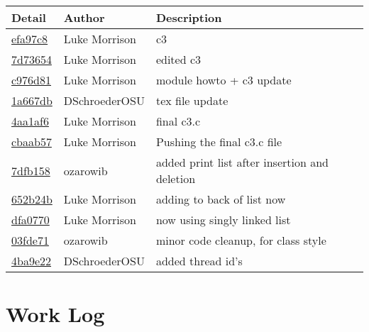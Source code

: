 \documentclass[10pt,letterpaper,draftclsnofoot,onecolumn]{IEEEtran}
\begin{document}
\begin{tabular}{l l l}\textbf{Detail} & \textbf{Author} & \textbf{Description}\\\hline
\href{https://github.com/DSchroederOSU/CS444-Group_11_05/commit/efa97c8a531581b74d351c5c3f0f8b1f13540455}{efa97c8} & Luke Morrison & c3\\\hline
\href{https://github.com/DSchroederOSU/CS444-Group_11_05/commit/7d73654979eb7198995a959c292dd2062401b464}{7d73654} & Luke Morrison & edited c3\\\hline
\href{https://github.com/DSchroederOSU/CS444-Group_11_05/commit/c976d8184cf0397b6f7128df89ca1d29ebc5f086}{c976d81} & Luke Morrison & module howto + c3 update\\\hline
\href{https://github.com/DSchroederOSU/CS444-Group_11_05/commit/1a667dbf3174f73e60390bb5b52e5872f4527904}{1a667db} & DSchroederOSU & tex file update\\\hline
\href{https://github.com/DSchroederOSU/CS444-Group_11_05/commit/4aa1af6a9d78818c90452ab3a39b933259228a2a}{4aa1af6} & Luke Morrison & final c3.c\\\hline
\href{https://github.com/DSchroederOSU/CS444-Group_11_05/commit/cbaab575cd530eb94a5e13746725d8393ca07735}{cbaab57} & Luke Morrison & Pushing the final c3.c file\\\hline
\href{https://github.com/DSchroederOSU/CS444-Group_11_05/commit/7dfb158f2585339b66bd87b04ddf70f9a8e191d3}{7dfb158} & ozarowib & added print list after insertion and deletion\\\hline
\href{https://github.com/DSchroederOSU/CS444-Group_11_05/commit/652b24b7d0412bb5b3044c9d4aa1fa3fcc6c8f1d}{652b24b} & Luke Morrison & adding to back of list now\\\hline
\href{https://github.com/DSchroederOSU/CS444-Group_11_05/commit/dfa0770241a97e5de391907bd1da8dfb18efc8ef}{dfa0770} & Luke Morrison & now using singly linked list\\\hline
\href{https://github.com/DSchroederOSU/CS444-Group_11_05/commit/03fde718e9793c36da5b8276f019b9c6ac7fcd5b}{03fde71} & ozarowib & minor code cleanup, for class style\\\hline
\href{https://github.com/DSchroederOSU/CS444-Group_11_05/commit/4ba9e226bc34720e009644e7625ad443ef06c8fb}{4ba9e22} & DSchroederOSU & added thread id's\\\hline\end{tabular}
\bigskip

\section{Work Log}
\bigskip
\end{document}
